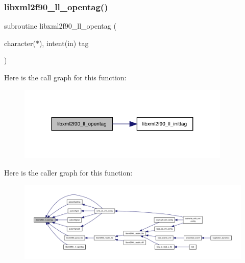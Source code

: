 \subsubsection{\texorpdfstring{libxml2f90\+\_\+ll\+\_\+opentag()}{libxml2f90\_ll\_opentag()}}
{\footnotesize\ttfamily subroutine libxml2f90\+\_\+ll\+\_\+opentag (\begin{DoxyParamCaption}\item[{character($\ast$), intent(in)}]{tag }\end{DoxyParamCaption})}

Here is the call graph for this function\+:
\nopagebreak
\begin{figure}[H]
\begin{center}
\leavevmode
\includegraphics[width=287pt]{libxml2f90_8f90__pp_8f90_a102819b1160e7cccf698c60979acaef5_cgraph}
\end{center}
\end{figure}
Here is the caller graph for this function\+:
\nopagebreak
\begin{figure}[H]
\begin{center}
\leavevmode
\includegraphics[width=350pt]{libxml2f90_8f90__pp_8f90_a102819b1160e7cccf698c60979acaef5_icgraph}
\end{center}
\end{figure}
\mbox{\label{libxml2f90_8f90__pp_8f90_a5ddfde66a72fddf024606b83f50ecc3a}} 
